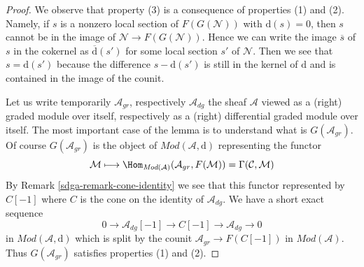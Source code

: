 \begin{proof}

We observe that property (3) is a consequence of properties (1) and (2).
Namely, if $s$ is a nonzero local section of $F(G(\mathcal{N}))$
with $\text{d}(s) = 0$, then $s$ cannot be in the image of
$\mathcal{N} \to F(G(\mathcal{N}))$. Hence we can write the image
$\overline{s}$ of $s$ in the cokernel as
$\overline{\text{d}}(s')$ for some local section $s'$ of $\mathcal{N}$.
Then we see that $s = \text{d}(s')$ because the difference
$s - \text{d}(s')$ is still in the kernel of $\text{d}$
and is contained in the image of the counit.

\medskip\noindent
Let us write temporarily $\mathcal{A}_{gr}$, respectively $\mathcal{A}_{dg}$
the sheaf $\mathcal{A}$ viewed as a (right) graded module over itself,
respectively as a (right) differential graded module over itself.
The most important case of the lemma is to understand what
is $G(\mathcal{A}_{gr})$. Of course $G(\mathcal{A}_{gr})$ is the object
of $\textit{Mod}(\mathcal{A}, \text{d})$ representing the
functor
$$
\mathcal{M} \longmapsto
\Hom_{\textit{Mod}(\mathcal{A})}(\mathcal{A}_{gr}, F(\mathcal{M})) =
\Gamma(\mathcal{C}, \mathcal{M})
$$
By Remark \ref{sdga-remark-cone-identity} we see that this functor represented
by $C[-1]$ where $C$ is the cone on the identity of $\mathcal{A}_{dg}$.
We have a short exact sequence
$$
0 \to \mathcal{A}_{dg}[-1] \to C[-1] \to \mathcal{A}_{dg} \to 0
$$
in $\textit{Mod}(\mathcal{A}, \text{d})$ which is split by the
counit $\mathcal{A}_{gr} \to F(C[-1])$ in $\textit{Mod}(\mathcal{A})$.
Thus $G(\mathcal{A}_{gr})$ satisfies properties (1) and (2).


\end{proof}
